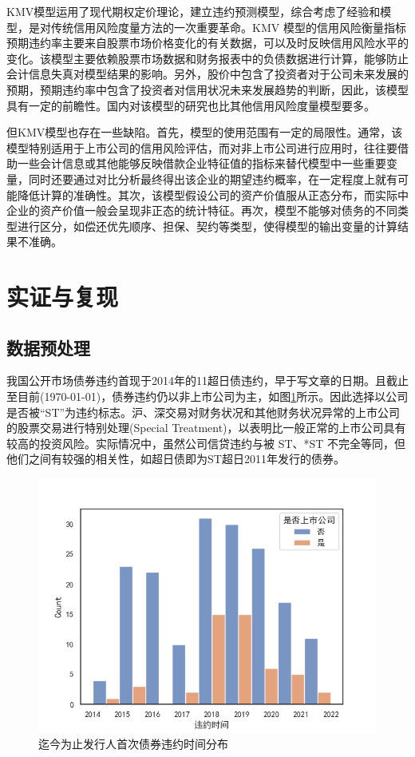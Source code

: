 \documentclass[a4paper,12pt]{ctexart}
\begin{document}
KMV模型运用了现代期权定价理论，建立违约预测模型，综合考虑了经验和模型，是对传统信用风险度量方法的一次重要革命。KMV 模型的信用风险衡量指标预期违约率主要来自股票市场价格变化的有关数据，可以及时反映信用风险水平的变化。该模型主要依赖股票市场数据和财务报表中的负债数据进行计算，能够防止会计信息失真对模型结果的影响。另外，股价中包含了投资者对于公司未来发展的预期，预期违约率中包含了投资者对信用状况未来发展趋势的判断，因此，该模型具有一定的前瞻性。国内对该模型的研究也比其他信用风险度量模型要多。

但KMV模型也存在一些缺陷。首先，模型的使用范围有一定的局限性。通常，该模型特别适用于上市公司的信用风险评估，而对非上市公司进行应用时，往往要借助一些会计信息或其他能够反映借款企业特征值的指标来替代模型中一些重要变量，同时还要通过对比分析最终得出该企业的期望违约概率，在一定程度上就有可能降低计算的准确性。其次，该模型假设公司的资产价值服从正态分布，而实际中企业的资产价值一般会呈现非正态的统计特征。再次，模型不能够对债务的不同类型进行区分，如偿还优先顺序、担保、契约等类型，使得模型的输出变量的计算结果不准确。

\section*{实证与复现}
\subsection*{数据预处理}

我国公开市场债券违约首现于2014年的11超日债违约，早于\citet{彭伟2012基于}写文章的日期。且截止至目前(\today)，债券违约仍以非上市公司为主，如图\ref{fig:default}所示。因此\citet{彭伟2012基于}选择以公司是否被“ST”为违约标志。沪、深交易对财务状况和其他财务状况异常的上市公司的股票交易进行特别处理(Special Treatment)，以表明比一般正常的上市公司具有较高的投资风险。实际情况中，虽然公司信贷违约与被 ST、*ST 不完全等同，但他们之间有较强的相关性，如超日债即为ST超日2011年发行的债券。
\begin{figure}[H]
    \centering
    \includegraphics*[width=\linewidth]{img/发行人首次债券违约.png}
    \caption{迄今为止发行人首次债券违约时间分布}\label{fig:default}
\end{figure}
\end{document}

